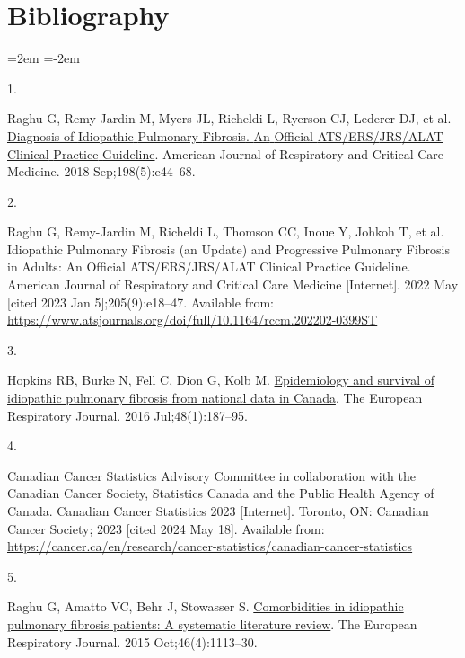 \documentclass[
]{article}
\newlength{\cslhangindent}
\newlength{\csllabelwidth}
\newenvironment{CSLReferences}[2] %
 {\begin{list}{}{%
  \setlength{\itemindent}{0pt}
  \setlength{\leftmargin}{0pt}
  \setlength{\parsep}{0pt}
  \ifodd #1
   \setlength{\leftmargin}{\cslhangindent}
   \setlength{\itemindent}{-1\cslhangindent}
  \fi
  \setlength{\itemsep}{#2\baselineskip}}}
 {\end{list}}
\newcommand{\CSLLeftMargin}[1]{\parbox[t]{\csllabelwidth}{\strut#1\strut}}
\newcommand{\CSLRightInline}[1]{\parbox[t]{\linewidth - \csllabelwidth}{\strut#1\strut}}
\begin{document}
\clearpage

\section*{Bibliography}

\noindent
\leftskip=2em
\parindent=-2em

\label{refs}
\begin{CSLReferences}{0}{1}
\CSLLeftMargin{1. }%
\CSLRightInline{Raghu G, Remy-Jardin M, Myers JL, Richeldi L, Ryerson CJ, Lederer DJ, et al. \href{https://doi.org/10.1164/rccm.201807-1255ST}{Diagnosis of {Idiopathic} {Pulmonary} {Fibrosis}. {An} {Official} {ATS}/{ERS}/{JRS}/{ALAT} {Clinical} {Practice} {Guideline}}. American Journal of Respiratory and Critical Care Medicine. 2018 Sep;198(5):e44--68. }

\CSLLeftMargin{2. }%
\CSLRightInline{Raghu G, Remy-Jardin M, Richeldi L, Thomson CC, Inoue Y, Johkoh T, et al. Idiopathic {Pulmonary} {Fibrosis} (an {Update}) and {Progressive} {Pulmonary} {Fibrosis} in {Adults}: {An} {Official} {ATS}/{ERS}/{JRS}/{ALAT} {Clinical} {Practice} {Guideline}. American Journal of Respiratory and Critical Care Medicine {[}Internet{]}. 2022 May {[}cited 2023 Jan 5{]};205(9):e18--47. Available from: \url{https://www.atsjournals.org/doi/full/10.1164/rccm.202202-0399ST}}

\CSLLeftMargin{3. }%
\CSLRightInline{Hopkins RB, Burke N, Fell C, Dion G, Kolb M. \href{https://doi.org/10.1183/13993003.01504-2015}{Epidemiology and survival of idiopathic pulmonary fibrosis from national data in {Canada}}. The European Respiratory Journal. 2016 Jul;48(1):187--95. }

\CSLLeftMargin{4. }%
\CSLRightInline{Canadian Cancer Statistics Advisory Committee in collaboration with the Canadian Cancer Society, Statistics Canada and the Public Health Agency of Canada. Canadian {Cancer} {Statistics} 2023 {[}Internet{]}. Toronto, ON: Canadian Cancer Society; 2023 {[}cited 2024 May 18{]}. Available from: \url{https://cancer.ca/en/research/cancer-statistics/canadian-cancer-statistics}}

\CSLLeftMargin{5. }%
\CSLRightInline{Raghu G, Amatto VC, Behr J, Stowasser S. \href{https://doi.org/10.1183/13993003.02316-2014}{Comorbidities in idiopathic pulmonary fibrosis patients: A systematic literature review}. The European Respiratory Journal. 2015 Oct;46(4):1113--30. }


\end{CSLReferences}
\end{document}
